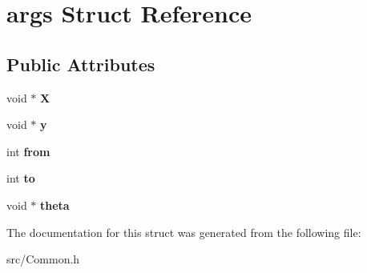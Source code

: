 \hypertarget{structargs}{\section{args Struct Reference}
\label{structargs}
}
\subsection*{Public Attributes}
\begin{DoxyCompactItemize}
\item 
\hypertarget{structargs_a630fde6767dd27969c66d1bcc1fc27ac}{void $\ast$ {\bfseries X}}\label{structargs_a630fde6767dd27969c66d1bcc1fc27ac}

\item 
\hypertarget{structargs_ad7454c5499e17c7464165b733c92caec}{void $\ast$ {\bfseries y}}\label{structargs_ad7454c5499e17c7464165b733c92caec}

\item 
\hypertarget{structargs_ac1f8cee8690ba4a147b4152958e65a17}{int {\bfseries from}}\label{structargs_ac1f8cee8690ba4a147b4152958e65a17}

\item 
\hypertarget{structargs_a9d71349fdf4133f93cb495fe2b5ed49a}{int {\bfseries to}}\label{structargs_a9d71349fdf4133f93cb495fe2b5ed49a}

\item 
\hypertarget{structargs_ac228a5965699f39a0751d3e859fa7a3a}{void $\ast$ {\bfseries theta}}\label{structargs_ac228a5965699f39a0751d3e859fa7a3a}

\end{DoxyCompactItemize}


The documentation for this struct was generated from the following file\-:\begin{DoxyCompactItemize}
\item 
src/Common.\-h\end{DoxyCompactItemize}
